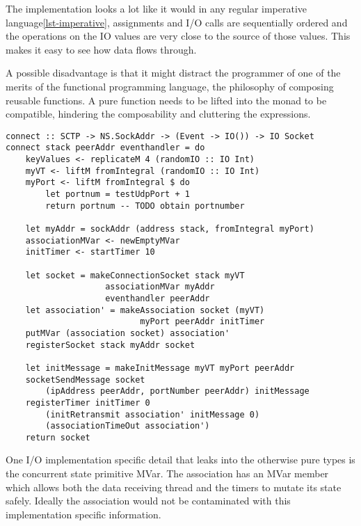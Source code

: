 

The implementation looks a lot like it would in any regular imperative language\ref{lst-imperative}, assignments and I/O calls are sequentially ordered and the operations on the IO values are very close to the source of those values. This makes it easy to see how data flows through.

A possible disadvantage is that it might distract the programmer of one of the merits of the functional programming language, the philosophy of composing reusable functions. A pure function needs to be lifted into the monad to be compatible, hindering the composability and cluttering the expressions.

\begin{lstlisting}[caption={The connect function looks imperative}, label={lst-imperative}]
connect :: SCTP -> NS.SockAddr -> (Event -> IO()) -> IO Socket
connect stack peerAddr eventhandler = do
    keyValues <- replicateM 4 (randomIO :: IO Int)
    myVT <- liftM fromIntegral (randomIO :: IO Int)
    myPort <- liftM fromIntegral $ do 
        let portnum = testUdpPort + 1
        return portnum -- TODO obtain portnumber

    let myAddr = sockAddr (address stack, fromIntegral myPort)
    associationMVar <- newEmptyMVar
    initTimer <- startTimer 10

    let socket = makeConnectionSocket stack myVT
                    associationMVar myAddr
                    eventhandler peerAddr
    let association' = makeAssociation socket (myVT) 
                           myPort peerAddr initTimer
    putMVar (association socket) association'
    registerSocket stack myAddr socket

    let initMessage = makeInitMessage myVT myPort peerAddr
    socketSendMessage socket 
        (ipAddress peerAddr, portNumber peerAddr) initMessage
    registerTimer initTimer 0 
        (initRetransmit association' initMessage 0)
        (associationTimeOut association')
    return socket
\end{lstlisting}

One I/O implementation specific detail that leaks into the otherwise pure types is the concurrent state primitive MVar. The association has an MVar member which allows both the data receiving thread and the timers to mutate its state safely. Ideally the association would not be contaminated with this implementation specific information.

